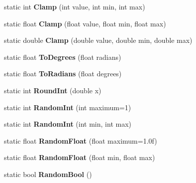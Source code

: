 \begin{DoxyCompactItemize}
\item 
\hypertarget{classMath_a47a54d98163a26bd779e5d55ada04212}{}static int {\bfseries Clamp} (int value, int min, int max)\label{classMath_a47a54d98163a26bd779e5d55ada04212}

\item 
\hypertarget{classMath_ae95e11ecbc56f98783b705377b9b29d2}{}static float {\bfseries Clamp} (float value, float min, float max)\label{classMath_ae95e11ecbc56f98783b705377b9b29d2}

\item 
\hypertarget{classMath_a7a5fc41dc7f58dff7611bbb494696a2d}{}static double {\bfseries Clamp} (double value, double min, double max)\label{classMath_a7a5fc41dc7f58dff7611bbb494696a2d}

\item 
\hypertarget{classMath_a140507f920c52298914a22d9c666b916}{}static float {\bfseries To\+Degrees} (float radians)\label{classMath_a140507f920c52298914a22d9c666b916}

\item 
\hypertarget{classMath_abd1d206e5441e7ae57ac4dcbcd1c952d}{}static float {\bfseries To\+Radians} (float degrees)\label{classMath_abd1d206e5441e7ae57ac4dcbcd1c952d}

\item 
\hypertarget{classMath_a53f4aaa015bfa0e025f2544fa1808a7f}{}static int {\bfseries Round\+Int} (double x)\label{classMath_a53f4aaa015bfa0e025f2544fa1808a7f}

\item 
\hypertarget{classMath_a0234dd2c80df9d3b33133aa1851e5987}{}static int {\bfseries Random\+Int} (int maximum=1)\label{classMath_a0234dd2c80df9d3b33133aa1851e5987}

\item 
\hypertarget{classMath_a7055d51fea793c221a20acadf028491d}{}static int {\bfseries Random\+Int} (int min, int max)\label{classMath_a7055d51fea793c221a20acadf028491d}

\item 
\hypertarget{classMath_ad884a7d84873d241b284e7191821e393}{}static float {\bfseries Random\+Float} (float maximum=1.\+0f)\label{classMath_ad884a7d84873d241b284e7191821e393}

\item 
\hypertarget{classMath_a578f0941c04d0b8ec7053cf790605b62}{}static float {\bfseries Random\+Float} (float min, float max)\label{classMath_a578f0941c04d0b8ec7053cf790605b62}

\item 
\hypertarget{classMath_a7ed06a614e5fb8fe9c9681e4bf7ffa7c}{}static bool {\bfseries Random\+Bool} ()\label{classMath_a7ed06a614e5fb8fe9c9681e4bf7ffa7c}

\end{DoxyCompactItemize}
